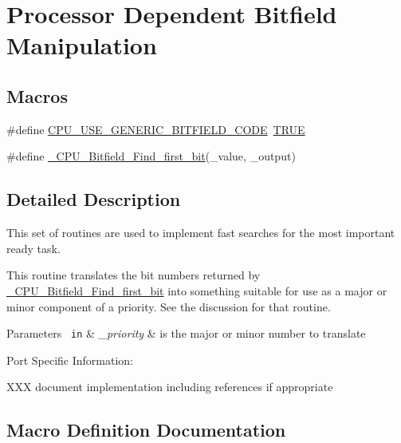 \hypertarget{group__RTEMSScoreCPUExampleBitfield}{}\section{Processor Dependent Bitfield Manipulation}
\label{group__RTEMSScoreCPUExampleBitfield}
\subsection*{Macros}
\begin{DoxyCompactItemize}
\item 
\#define \mbox{\hyperlink{group__RTEMSScoreCPUExampleBitfield_gab0aff7a561b9c030a4d88eff201f4688}{C\+P\+U\+\_\+\+U\+S\+E\+\_\+\+G\+E\+N\+E\+R\+I\+C\+\_\+\+B\+I\+T\+F\+I\+E\+L\+D\+\_\+\+C\+O\+DE}}~\mbox{\hyperlink{group__RTEMSScoreBaseDefs_gaa8cecfc5c5c054d2875c03e77b7be15d}{T\+R\+UE}}
\item 
\#define \mbox{\hyperlink{group__RTEMSScoreCPUExampleBitfield_gabbc6ee0d13009243d4088dfde2fe5da9}{\+\_\+\+C\+P\+U\+\_\+\+Bitfield\+\_\+\+Find\+\_\+first\+\_\+bit}}(\+\_\+value,  \+\_\+output)
\end{DoxyCompactItemize}


\subsection{Detailed Description}
This set of routines are used to implement fast searches for the most important ready task.

This routine translates the bit numbers returned by \mbox{\hyperlink{group__RTEMSScoreCPUExampleBitfield_gabbc6ee0d13009243d4088dfde2fe5da9}{\+\_\+\+C\+P\+U\+\_\+\+Bitfield\+\_\+\+Find\+\_\+first\+\_\+bit}} into something suitable for use as a major or minor component of a priority. See the discussion for that routine.


\begin{DoxyParams}[1]{Parameters}
\mbox{\texttt{ in}}  & {\em \+\_\+priority} & is the major or minor number to translate\\
\hline
\end{DoxyParams}
Port Specific Information\+:

X\+XX document implementation including references if appropriate 

\subsection{Macro Definition Documentation}
\mbox{\label{group__RTEMSScoreCPUExampleBitfield_gabbc6ee0d13009243d4088dfde2fe5da9}} 

